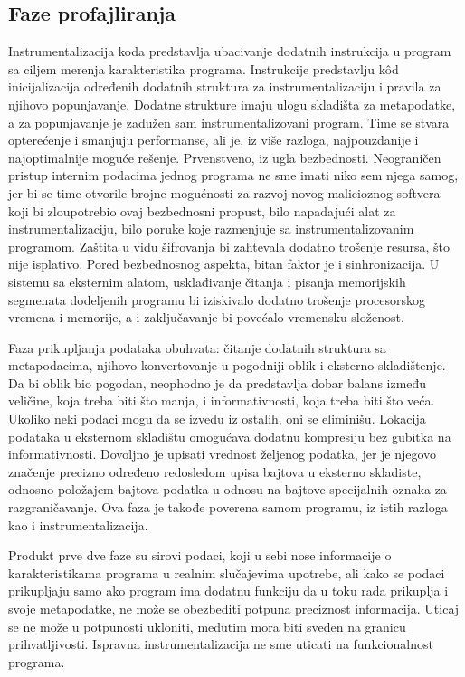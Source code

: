 \documentclass[12pt,oneside]{memoir}
\begin{document}
\subsection{Faze profajliranja}

Instrumentalizacija \cite{SCI} koda predstavlja ubacivanje dodatnih instrukcija u program sa ciljem merenja karakteristika programa. Instrukcije predstavlju k\^{o}d inicijalizacija određenih dodatnih struktura za instrumentalizaciju i pravila za njihovo popunjavanje. Dodatne strukture imaju ulogu skladišta za metapodatke, a za popunjavanje je zadužen sam instrumentalizovani program. Time se stvara opterećenje i smanjuju performanse, ali je, iz više razloga, najpouzdanije i najoptimalnije moguće rešenje. Prvenstveno, iz ugla bezbednosti. Neograničen pristup internim podacima jednog programa ne sme imati niko sem njega samog, jer bi se time otvorile brojne mogućnosti za razvoj novog malicioznog softvera koji bi zloupotrebio ovaj bezbednosni propust, bilo napadajući alat za instrumentalizaciju, bilo poruke koje razmenjuje sa instrumentalizovanim programom. Zaštita u vidu šifrovanja bi zahtevala dodatno trošenje resursa, što nije isplativo. Pored bezbednosnog aspekta, bitan faktor je i sinhronizacija. U sistemu sa eksternim alatom, usklađivanje čitanja i pisanja memorijskih segmenata dodeljenih programu bi iziskivalo dodatno trošenje procesorskog vremena i memorije, a i zaključavanje bi povećalo vremensku složenost.

Faza prikupljanja podataka obuhvata: čitanje dodatnih struktura sa metapodacima, njihovo konvertovanje u pogodniji oblik i eksterno skladištenje. Da bi oblik bio pogodan, neophodno je da predstavlja dobar balans između veličine, koja treba biti što manja, i informativnosti, koja treba biti što veća. Ukoliko neki podaci mogu da se izvedu iz ostalih, oni se eliminišu. Lokacija podataka u eksternom skladištu omogućava dodatnu kompresiju bez gubitka na informativnosti. Dovoljno je upisati vrednost željenog podatka, jer je njegovo značenje precizno određeno redosledom upisa bajtova u eksterno skladiste, odnosno položajem bajtova podatka u odnosu na bajtove specijalnih oznaka za razgraničavanje. Ova faza je takođe poverena samom programu, iz istih razloga kao i instrumentalizacija.

Produkt prve dve faze su sirovi podaci, koji u sebi nose informacije o karakteristikama programa u realnim slučajevima upotrebe, ali kako se podaci prikupljaju samo ako program ima dodatnu funkciju da u toku rada prikuplja i svoje metapodatke, ne može se obezbediti potpuna preciznost informacija. Uticaj se ne može u potpunosti ukloniti, međutim mora biti sveden na granicu prihvatljivosti. Ispravna instrumentalizacija ne sme uticati na funkcionalnost programa.
\end{document}
